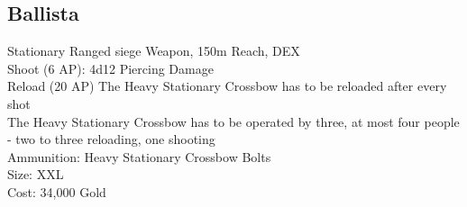 \subsection{Ballista}\label{weapon:ballista}
Stationary Ranged siege Weapon, 150m Reach, DEX\\
Shoot (6 AP): 4d12 Piercing Damage\\
Reload (20 AP) The Heavy Stationary Crossbow has to be reloaded after every shot\\
The Heavy Stationary Crossbow has to be operated by three, at most four people - two to three reloading, one shooting\\
Ammunition: Heavy Stationary Crossbow Bolts\\
Size: XXL\\
Cost: 34,000 Gold\\